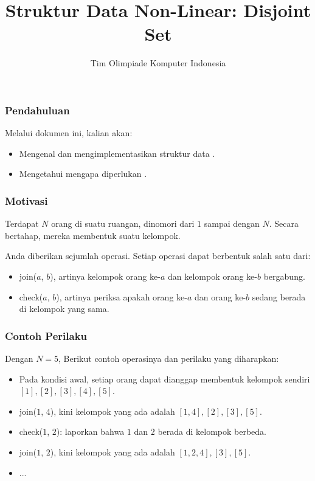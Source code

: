 

\title{Struktur Data Non-Linear: \newline Disjoint Set}
\author{Tim Olimpiade Komputer Indonesia}
\date{}



\begin{frame}
\titlepage
\end{frame}

\begin{frame}
\frametitle{Pendahuluan}
Melalui dokumen ini, kalian akan:
\begin{itemize}
  \item Mengenal dan mengimplementasikan struktur data \pdjs.
  \item Mengetahui mengapa diperlukan \pdjs.
\end{itemize}
\end{frame}

\begin{frame}
\frametitle{Motivasi}
Terdapat $N$ orang di suatu ruangan, dinomori dari $1$ sampai dengan $N$. Secara bertahap, mereka membentuk suatu kelompok.\newline

Anda diberikan sejumlah operasi. Setiap operasi dapat berbentuk salah satu dari:
\begin{itemize}
  \item join($a$, $b$), artinya kelompok orang ke-$a$ dan kelompok orang ke-$b$ bergabung.
  \item check($a$, $b$), artinya periksa apakah orang ke-$a$ dan orang ke-$b$ sedang berada di kelompok yang sama.
\end{itemize}
\end{frame}

\begin{frame}
\frametitle{Contoh Perilaku}
Dengan $N=5$, Berikut contoh operasinya dan perilaku yang diharapkan:
\begin{itemize}
  \item Pada kondisi awal, setiap orang dapat dianggap membentuk kelompok sendiri $[1], [2], [3], [4], [5]$.
  \item join($1$, $4$), kini kelompok yang ada adalah $[1, 4], [2], [3], [5]$.
  \item check($1$, $2$): laporkan bahwa $1$ dan $2$ berada di kelompok berbeda.
  \item join($1$, $2$), kini kelompok yang ada adalah $[1, 2, 4], [3], [5]$.
  \item ...
\end{itemize}
\end{frame}


